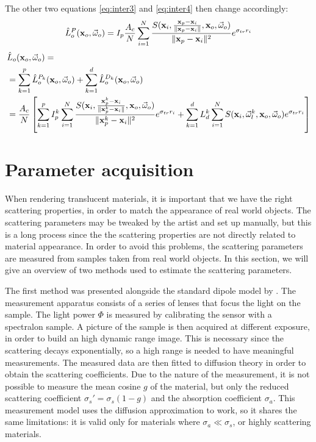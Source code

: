 The other two equations \ref{eq:inter3} and \ref{eq:inter4} then change accordingly:
$$
\hat{L}_o^P(\mathbf{x}_o,\vec{\omega}_o) = I_p \frac{A_c}{N} \sum_{i = 1}^N \frac{S(\mathbf{x}_i, \frac{\mathbf{x}_p - \mathbf{x}_i}{\|\mathbf{x}_p - \mathbf{x}_i\|}, \mathbf{x}_o, \vec{\omega}_o)}{\|\mathbf{x}_p - \mathbf{x}_i\|^2}  e^{\sigma_{tr} r_i}
$$
\begin{equation*}
\begin{split}
&\hat{L}_o(\mathbf{x}_o,\vec{\omega}_o) = \\
&= \sum_{k=1}^{p}\hat{L}_o^{P_k}(\mathbf{x}_o,\vec{\omega}_o) + \sum_{k=1}^{d}\hat{L}_o^{D_k}(\mathbf{x}_o,\vec{\omega}_o) \\
&= \frac{A_c}{N} \left[ \sum_{k=1}^{p}I_p^k \sum_{i = 1}^N \frac{S(\mathbf{x}_i, \frac{\mathbf{x}_p^k - \mathbf{x}_i}{\|\mathbf{x}_p^k - \mathbf{x}_i\|}, \mathbf{x}_o, \vec{\omega}_o)}{\|\mathbf{x}_p^k - \mathbf{x}_i\|^2} e^{\sigma_{tr} r_i} + \sum_{k=1}^{d} L_d^k \sum_{i = 1}^N S(\mathbf{x}_i, \vec{\omega}^k_l, \mathbf{x}_o, \vec{\omega}_o) e^{\sigma_{tr} r_i}\right] 
\end{split}
\end{equation*}

\section{Parameter acquisition}
When rendering translucent materials, it is important that we have the right scattering properties, in order to match the appearance of real world objects. The scattering parameters may be tweaked by the artist and set up manually, but this is a long process since the the scattering properties are not directly related to material appearance. In order to avoid this problems, the scattering parameters are measured from samples taken from real world objects. In this section, we will give an overview of two methods used to estimate the scattering parameters.

The first method was presented alongside the standard dipole model by \cite{Jensen:2001:PMS:383259.383319}. The measurement apparatus consists of a series of lenses that focus the light on the sample. The light power $\Phi$ is measured by calibrating the sensor with a spectralon sample. A picture of the sample is then acquired at different exposure, in order to build an high dynamic range image. This is necessary since the scattering decays exponentially, so a high range is needed to have meaningful measurements. The measured data are then fitted to diffusion theory in order to obtain the scattering coefficients. Due to the nature of the measurement, it is not possible to measure the mean cosine $g$ of the material, but only the reduced scattering coefficient $\sigma_s' = \sigma_s (1 - g)$ and the absorption coefficient $\sigma_a$. This measurement model uses the diffusion approximation to work, so it shares the same limitations: it is valid only for materials where $\sigma_a \ll \sigma_s$, or highly scattering materials.

